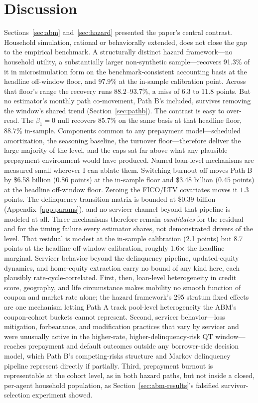 \documentclass[12pt]{article}
\begin{document}
\section{Discussion}\label{sec:discussion}

Sections~\ref{sec:abm} and~\ref{sec:hazard} presented the paper's central contrast. Household simulation, rational or behaviorally extended, does not close the gap to the empirical benchmark. A structurally distinct hazard framework---no household utility, a substantially larger non-synthetic sample---recovers 91.3\% of it in microsimulation form on the benchmark-consistent accounting basis at the headline off-window floor, and 97.9\% at the in-sample calibration point. Across that floor's range the recovery runs 88.2--93.7\%, a miss of 6.3 to 11.8 points. But no estimator's monthly path co-movement, Path B's included, survives removing the window's shared trend (Section~\ref{sec:pathb}). The contrast is easy to over-read. The $\beta_1 = 0$ null recovers 85.7\% on the same basis at that headline floor, 88.7\% in-sample. Components common to any prepayment model---scheduled amortization, the seasoning baseline, the turnover floor---therefore deliver the large majority of the level, and the caps sat far above what any plausible prepayment environment would have produced. Named loan-level mechanisms are measured small wherever I can ablate them. Switching burnout off moves Path B by \$6.58 billion ($0.86$ points) at the in-sample floor and \$3.48 billion ($0.45$ points) at the headline off-window floor. Zeroing the FICO/LTV covariates moves it $1.3$ points. The delinquency transition matrix is bounded at \$0.39 billion (Appendix~\ref{app:params}), and no servicer channel beyond that pipeline is modeled at all. Three mechanisms therefore remain \emph{candidates} for the residual and for the timing failure every estimator shares, not demonstrated drivers of the level. That residual is modest at the in-sample calibration (2.1 points) but 8.7 points at the headline off-window calibration, roughly 1.6$\times$ the headline marginal. Servicer behavior beyond the delinquency pipeline, updated-equity dynamics, and home-equity extraction carry no bound of any kind here, each plausibly rate-cycle-correlated. First, then, loan-level heterogeneity in credit score, geography, and life circumstance makes mobility no smooth function of coupon and market rate alone; the hazard framework's 295 stratum fixed effects are one mechanism letting Path A track pool-level heterogeneity the ABM's coupon-cohort buckets cannot represent. Second, servicer behavior---loss mitigation, forbearance, and modification practices that vary by servicer and were unusually active in the higher-rate, higher-delinquency-risk QT window---reaches prepayment and default outcomes outside any borrower-side decision model, which Path B's competing-risks structure and Markov delinquency pipeline represent directly if partially. Third, prepayment burnout is representable at the cohort level, as in both hazard paths, but not inside a closed, per-agent household population, as Section~\ref{sec:abm-results}'s falsified survivor-selection experiment showed.
\end{document}
